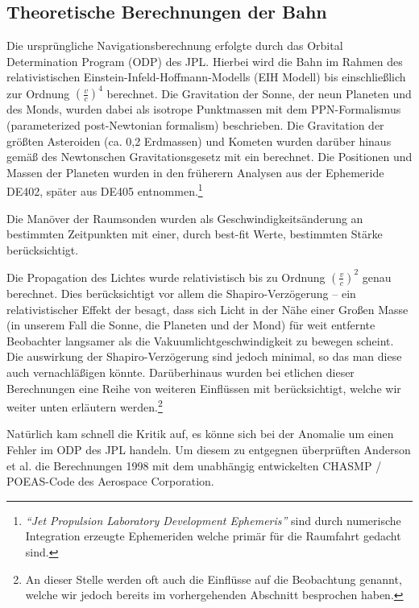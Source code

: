 
\subsection{Theoretische Berechnungen der Bahn}
Die ursprüngliche Navigationsberechnung erfolgte durch das Orbital Determination Program (ODP) des JPL.
Hierbei wird die Bahn im Rahmen des relativistischen Einstein-Infeld-Hoffmann-Modells (EIH Modell)
bis einschließlich zur Ordnung $(\frac{v}{c})^4$ berechnet.
Die Gravitation der Sonne, der neun Planeten und des Monds, wurden dabei als isotrope Punktmassen mit dem
PPN-Formalismus (parameterized post-Newtonian formalism) beschrieben\cite{Anderson2002}. Die Gravitation der größten
Asteroiden (ca. 0,2 Erdmassen) und Kometen wurden darüber hinaus gemäß des Newtonschen Gravitationsgesetz mit
ein berechnet. Die Positionen und Massen der Planeten wurden in den früherern Analysen aus der Ephemeride
DE402, später aus DE405 entnommen.\footnote{\textit{``Jet Propulsion Laboratory Development Ephemeris''} sind durch
numerische Integration erzeugte Ephemeriden welche primär für die Raumfahrt gedacht sind.}\cite{Anderson2002}

Die Manöver der Raumsonden wurden als Geschwindigkeitsänderung an bestimmten Zeitpunkten mit einer, durch best-fit Werte,
bestimmten Stärke berücksichtigt.\cite{Levy2008}	%

Die Propagation des Lichtes wurde relativistisch bis zu Ordnung $(\frac{v}{c})^2$ genau berechnet. Dies berücksichtigt
vor allem die Shapiro-Verzögerung – ein relativistischer Effekt der besagt, dass sich Licht in der Nähe einer Großen
Masse (in unserem Fall die Sonne, die Planeten und der Mond) für weit entfernte Beobachter langsamer als die
Vakuumlichtgeschwindigkeit zu bewegen scheint. %
Die auswirkung der Shapiro-Verzögerung sind jedoch minimal,\cite{Levy2008} so das man diese auch vernachläßigen könnte.
Darüberhinaus wurden bei etlichen dieser Berechnungen eine Reihe von weiteren Einflüssen mit berücksichtigt, welche wir
weiter unten %
erläutern werden.\footnote{An dieser Stelle werden oft auch die Einflüsse auf die Beobachtung genannt, welche wir jedoch
bereits im vorhergehenden Abschnitt besprochen haben.}


Natürlich kam schnell die Kritik auf, es könne sich bei der Anomalie um einen Fehler im ODP des JPL handeln.
Um diesem zu entgegnen überprüften Anderson et al. die Berechnungen 1998 mit dem unabhängig entwickelten CHASMP / POEAS-Code des Aerospace Corporation.

